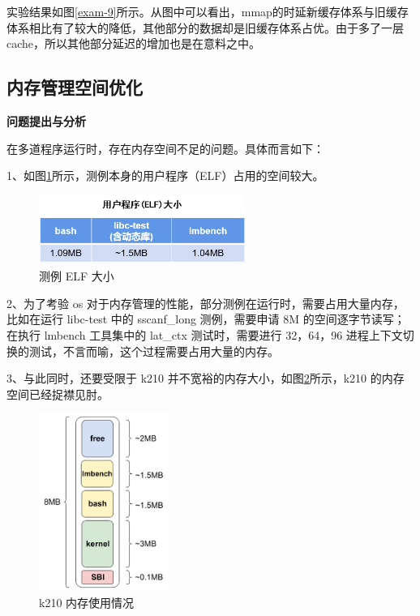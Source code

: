 实验结果如图\ref{exam-9}所示。从图中可以看出，mmap的时延新缓存体系与旧缓存体系相比有了较大的降低，其他部分的数据却是旧缓存体系占优。由于多了一层cache，所以其他部分延迟的增加也是在意料之中。

\subsection{内存管理空间优化}

\textbf{问题提出与分析}

在多道程序运行时，存在内存空间不足的问题。具体而言如下：

1、如图\ref{fig:ELF}所示，测例本身的用户程序（ELF）占用的空间较大。

\begin{figure}[H]
	\centering
	\includegraphics[width=0.6\textwidth]{figures/10-04-测例ELF.jpg}
	\caption{测例 ELF 大小}
	\label{fig:ELF}
\end{figure}

2、为了考验 os 对于内存管理的性能，部分测例在运行时，需要占用大量内存，比如在运行 libc-test 中的 sscanf_long 测例，需要申请 8M 的空间逐字节读写；在执行 lmbench 工具集中的 lat_ctx 测试时，需要进行 32，64，96 进程上下文切换的测试，不言而喻，这个过程需要占用大量的内存。

3、与此同时，还要受限于 k210 并不宽裕的内存大小，如图\ref{fig:k210}所示，k210 的内存空间已经捉襟见肘。

\begin{figure}[h]
	\centering
	\includegraphics[width=0.38\textwidth]{figures/10-04-k210内存空间.jpg}
	\caption{k210 内存使用情况}
	\label{fig:k210}
\end{figure}

